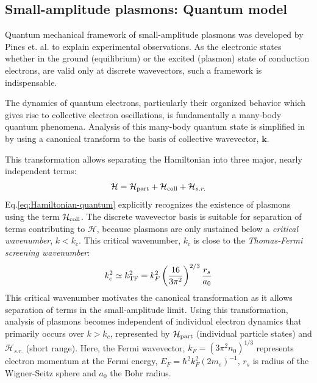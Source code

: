 \documentclass[aps,twocolumn,notitlepage,superscriptaddress]{revtex4-1}
\renewcommand\vec{\mathbf}
\begin{document}
\subsection{Small-amplitude plasmons: Quantum model}
\label{subsec:quantum-small-plasmons}
Quantum mechanical framework of small-amplitude plasmons was developed by Pines et. al. \cite{Pines-Bohm-PhysRev-1952, Pines-PhysRev-1953} to explain experimental observations. As the electronic states whether in the ground (equilibrium) or the excited (plasmon) state of conduction electrons, are valid only at discrete wavevectors, such a framework is indispensable. 

The dynamics of quantum electrons, particularly their organized behavior which gives rise to collective electron oscillations, is fundamentally a many-body quantum phenomena. Analysis of this many-body quantum state is simplified in \cite{Pines-PhysRev-1953} by using a canonical transform to the basis of collective wavevector, $\vec{k}$.

This transformation allows separating the Hamiltonian into three major, nearly independent terms:
\begin{align}\label{eq:Hamiltonian-quantum}
\begin{split} 
\mathcal{H} = \mathcal{H}_{\rm part}+\mathcal{H}_{\rm coll}+\mathcal{H}_{s. r.} 
\end{split}
\end{align}
Eq.\ref{eq:Hamiltonian-quantum} explicitly recognizes the existence of plasmons using the term $\mathcal{H}_{\rm coll}$. The discrete wavevector basis is suitable for separation of terms contributing to $\mathcal{H}$, because plasmons are only sustained below a {\em critical wavenumber}, $k<k_c$. This critical wavenumber, $k_c$ is close to the {\em Thomas-Fermi screening wavenumber}:
\begin{align}\label{eq:plasmon-critical-wavenumber}
\begin{split} 
k_c^2 \simeq k_{\rm TF}^2 = k_F^2 \left( \frac{16}{3\pi^2}\right)^{2/3} \frac{r_s}{a_0}
\end{split}
\end{align}
This critical wavenumber motivates the canonical transformation as it allows separation of terms in the small-amplitude limit. Using this transformation, analysis of plasmons becomes independent of individual electron dynamics that primarily occurs over $k>k_c$, represented by $\mathcal{H}_{\rm part}$ (individual particle states) and $\mathcal{H}_{s. r.}$ (short range). Here, the Fermi wavevector, $k_F=(3\pi^2 n_0)^{1/3}$ represents electron momentum at the Fermi energy, $E_F=\hbar^2k_F^2(2m_e)^{-1}$, $r_s$ is radius of the Wigner-Seitz sphere and $a_0$ the Bohr radius.
\end{document}
